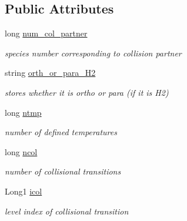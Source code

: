 \subsection*{Public Attributes}
\begin{DoxyCompactItemize}
\item 
\mbox{\label{structCollisionPartner_a3f3473033897886c538287cab6e12f38}} 
long \mbox{\hyperlink{structCollisionPartner_a3f3473033897886c538287cab6e12f38}{num\+\_\+col\+\_\+partner}}
\begin{DoxyCompactList}\small\item\em species number corresponding to collision partner \end{DoxyCompactList}\item 
\mbox{\label{structCollisionPartner_ab45bc877fdf1582a038c37fba524f4d0}} 
string \mbox{\hyperlink{structCollisionPartner_ab45bc877fdf1582a038c37fba524f4d0}{orth\+\_\+or\+\_\+para\+\_\+\+H2}}
\begin{DoxyCompactList}\small\item\em stores whether it is ortho or para (if it is H2) \end{DoxyCompactList}\item 
\mbox{\label{structCollisionPartner_a0aceab5d0a19ab8c7e591dda9731f4d3}} 
long \mbox{\hyperlink{structCollisionPartner_a0aceab5d0a19ab8c7e591dda9731f4d3}{ntmp}}
\begin{DoxyCompactList}\small\item\em number of defined temperatures \end{DoxyCompactList}\item 
\mbox{\label{structCollisionPartner_a273483803a058c51ac517e707886f2aa}} 
long \mbox{\hyperlink{structCollisionPartner_a273483803a058c51ac517e707886f2aa}{ncol}}
\begin{DoxyCompactList}\small\item\em number of collisional transitions \end{DoxyCompactList}\item 
\mbox{\label{structCollisionPartner_afdef4ff7e1f5d025eeacc16f0e076f26}} 
Long1 \mbox{\hyperlink{structCollisionPartner_afdef4ff7e1f5d025eeacc16f0e076f26}{icol}}
\begin{DoxyCompactList}\small\item\em level index of collisional transition \end{DoxyCompactList}\item 

\end{DoxyCompactItemize}
